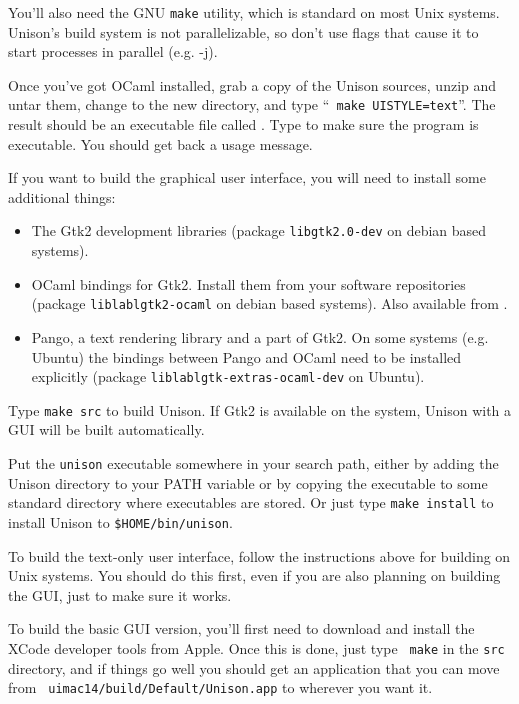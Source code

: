 \documentclass{article}
\begin{document}
You'll also need the GNU {\tt make} utility, which is standard on most Unix
systems.  Unison's build system is not parallelizable, so don't use flags
that cause it to start processes in parallel (e.g. -j).

Once you've got OCaml installed, grab a copy of the Unison sources, unzip
and untar them, change to the new  directory, and type ``{\tt
  make UISTYLE=text}''.  The result should be an executable file called
.  Type  to make sure the program is
executable.  You should get back a usage message.

If you want to build the graphical user interface, you will need to install
some additional things:
\begin{itemize}
\item The Gtk2 development libraries (package {\tt libgtk2.0-dev} on debian
based systems).
\item OCaml bindings for Gtk2. Install them from your software repositories
(package {\tt liblablgtk2-ocaml} on debian based systems). Also available
from .
\item Pango, a text rendering library and a part of Gtk2. On some systems
(e.g. Ubuntu) the bindings between Pango and OCaml need to be installed
explicitly (package {\tt liblablgtk-extras-ocaml-dev} on Ubuntu).
\end{itemize}
Type {\tt make src} to build Unison. If Gtk2 is available on the system,
Unison with a GUI will be built automatically.

Put the \verb|unison| executable somewhere in your search path, either by
adding the Unison directory to your PATH variable or by copying the
executable to some standard directory where executables are stored.  Or just
type {\tt make install} to install Unison to {\tt \$HOME/bin/unison}.


To build the text-only user interface, follow the instructions above for
building on Unix systems.  You should do this first, even if you are also
planning on building the GUI, just to make sure it works.

To build the basic GUI version, you'll first need to download and install
the XCode developer tools from Apple.  Once this is done, just type {\tt
  make} in the {\tt src} directory, and if things go well you
should get an application that you can move from {\tt
  uimac14/build/Default/Unison.app} to wherever you want it.
\end{document}
